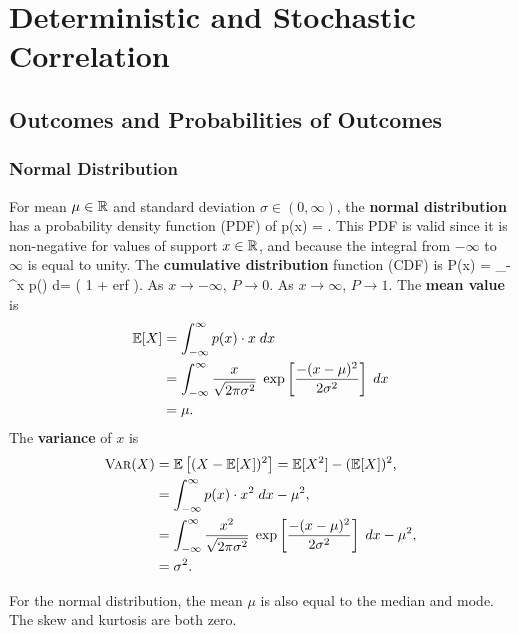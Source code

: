 \chapter{Deterministic and Stochastic Correlation}

\section{Outcomes and Probabilities of Outcomes}

\subsection{Normal Distribution}
For mean $\mu \in \mathbb{R}$ and standard deviation 
$\sigma \in (0, \infty)$,
the {\bf normal distribution} has a 
probability density function (PDF) of 
\be
p(x) 
= 
\; \exp 
{}.
\ee
This PDF is valid since it is non-negative for values of
support $x \in \mathbb{R}$, and because the integral from 
$-\infty$ to $\infty$ is equal to unity.  
The {\bf cumulative distribution} 
function (CDF) is 
\be
P(x) = 
\int_{-\infty}^{x} p(\tau) \; d\tau = 
\half 
\left(
1 + 
\mbox{erf} \;
\right).
\ee
As $x \rightarrow -\infty$, $P \rightarrow 0$.
As $x \rightarrow \infty$, $P \rightarrow 1$.
The {\bf mean value} is 
\begin{align}
 \mathbb{E}[X] & = 
 \int_{-\infty}^{\infty} p(x) \cdot x \; dx \\
 & = 
 \int_{-\infty}^{\infty} 
\frac{x}{\sqrt{2 \pi \sigma^2}} 
\; \exp 
\left[ 
\frac{-(x - \mu)^2}{2 \sigma^2}
\right] \;dx \\
 & = \mu.
\end{align}
The {\bf variance} of $x$ is
\begin{align}
\mbox{\sc Var}(X) 
 & = 
 \mathbb{E}\left[ (X - \mathbb{E}[X])^2 \right] = \mathbb{E}[X^2] - (\mathbb{E}[X])^2, \\
 & = 
 \int_{-\infty}^{\infty} p(x) \cdot x^2 \; dx - \mu^2,  \\
 & = 
 \int_{-\infty}^{\infty} 
\frac{x^2}{\sqrt{2 \pi \sigma^2}} 
\; \exp 
\left[ 
\frac{-(x - \mu)^2}{2 \sigma^2}
\right] \;dx - \mu^2,  \\
 & = \sigma^2.
\end{align}

\begin{Hremark}
For the normal distribution, the mean $\mu$ is also 
equal to the median and mode.  The skew and kurtosis are 
both zero.
\end{Hremark}

